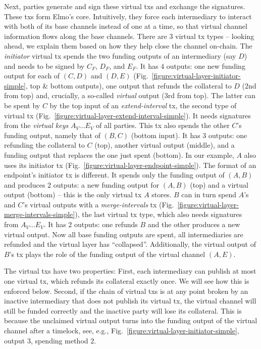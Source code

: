   Next, parties generate and sign these virtual txs and exchange the signatures.
  These txs form
  Elmo's core. Intuitively, they force each intermediary to interact with both of its
  base channels instead of one at a time, so that virtual channel information
  flows along the base channels. There are $3$ virtual
  tx types -- looking ahead, we explain them based on how they help
  close the channel on-chain. The \emph{initiator} virtual tx spends the two funding outputs of an
  intermediary (say $D$) and needs to be signed by $C_F$, $D_F$, and $E_F$.
  It has $4$ outputs: one new funding
  output for each of $(C, D)$ and $(D, E)$
  (Fig.~\ref{figure:virtual-layer-initiator-simple}, top \& bottom outputs), one
  output that refunds the collateral to $D$ ($2$nd from top) and,
  crucially, a so-called \emph{virtual} output ($3$rd from top). The latter
  can be spent by $C$ by the top input of an \emph{extend-interval} tx, the second type of virtual
  tx (Fig.~\ref{figure:virtual-layer-extend-interval-simple}). It needs
  signatures from the \emph{virtual keys} $A_V \dots E_V$ of all parties. This
  tx also spends the other $C$'s funding output, namely that of $(B,C)$ (bottom
  input). It has $3$ outputs: one refunding the collateral to $C$
  (top), another virtual output (middle), and a funding output that replaces the
  one just spent (bottom). In our example, $A$ also uses its initiator tx
  (Fig.~\ref{figure:virtual-layer-endpoint-simple}). The format of an endpoint's
  initiator tx is different. It spends only the funding output of
  $(A, B)$ and produces $2$ outputs: a new funding output for $(A, B)$ (top) and
  a virtual output (bottom) -- this is the only virtual tx $A$ stores. $B$ can in
  turn spend $A$'s and $C$'s virtual outputs with a
  \emph{merge-intervals} tx
  (Fig.~\ref{figure:virtual-layer-merge-intervals-simple}), the last virtual tx
  type, which also needs signatures from $A_V \dots E_V$. It has $2$ outputs: one refunds $B$ and
  the other produces a new virtual
  output. Now
  all base funding outputs are spent, all intermediaries are refunded and the
  virtual layer has ``collapsed''. Additionally, the
  virtual output of $B$'s tx plays the role of the funding output of the virtual
  channel $(A, E)$.

  The virtual txs have two properties: First, each intermediary can
  publish at most one virtual tx, which refunds its collateral
  exactly once. We will see how this is enforced below. Second, if the chain of
  virtual txs is at any point broken by
  an inactive intermediary that does not publish its virtual tx, the
  virtual channel will still be funded correctly and the inactive party will
  lose its collateral. This is because
  the unclaimed virtual output turns into the funding output of
  the virtual channel
  after a timelock, see, e.g., Fig.~\ref{figure:virtual-layer-initiator-simple},
  output $3$, spending method $2$.

